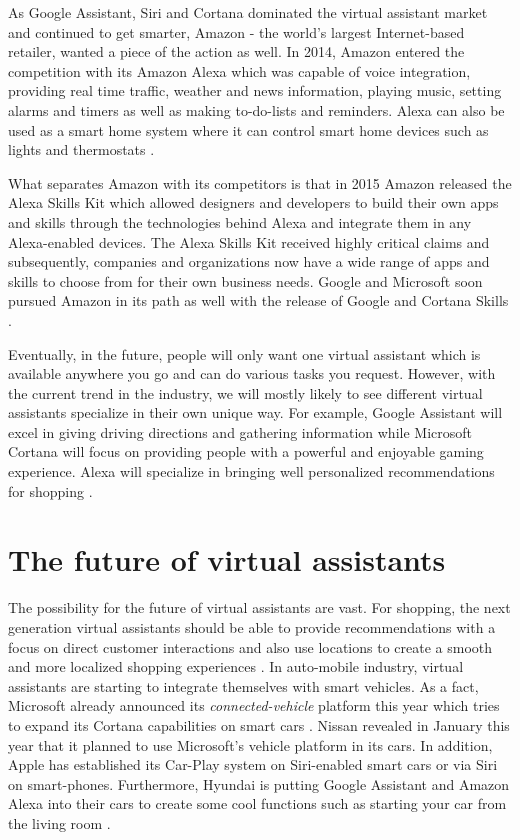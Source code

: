 As Google Assistant, Siri and Cortana dominated the virtual assistant market and continued to get smarter, Amazon - the world's largest Internet-based retailer, wanted a piece of the action as well. In 2014, Amazon entered the competition with its Amazon Alexa which was capable of voice integration, providing real time traffic, weather and news information, playing music, setting alarms and timers as well as making to-do-lists and reminders. Alexa can also be used as a smart home system where it can control smart home devices such as lights and thermostats \cite{Marvin2017them}. 

What separates Amazon with its competitors is that in 2015 Amazon released the Alexa Skills Kit which allowed designers and developers to build their own apps and skills through the technologies behind Alexa and integrate them in any Alexa-enabled devices. The Alexa Skills Kit received highly critical claims and subsequently, companies and organizations now have a wide range of apps and skills to choose from for their own business needs. Google and Microsoft soon pursued Amazon in its path as well with the release of Google and Cortana Skills \cite{Marvin2017them}.

Eventually, in the future, people will only want one virtual assistant which is available anywhere you go and can do various tasks you request. However, with the current trend in the industry, we will mostly likely to see different virtual assistants specialize in their own unique way. For example, Google Assistant will excel in giving driving directions and gathering information while Microsoft Cortana will focus on providing people with a powerful and enjoyable gaming experience. Alexa will specialize in bringing well personalized recommendations for shopping \cite{Baron2017assistants}.

\section{The future of virtual assistants}

The possibility for the future of virtual assistants are vast. For shopping, the next generation virtual assistants should be able to provide recommendations with a focus on direct customer interactions and also use locations to create a smooth and more localized shopping experiences \cite{Hard2014applications}. In auto-mobile industry, virtual assistants are starting to integrate themselves with smart vehicles. As a fact, Microsoft already announced its {\em connected-vehicle} platform this year which tries to expand its Cortana capabilities on smart cars \cite{Baron2017assistants}. Nissan revealed in January this year that it planned to use Microsoft's vehicle platform in its cars. In addition, Apple has established its Car-Play system on Siri-enabled smart cars or via Siri on smart-phones. Furthermore, Hyundai is putting Google Assistant and Amazon Alexa into their cars to create some cool functions such as starting your car from the living room \cite{Baron2017assistants}.

